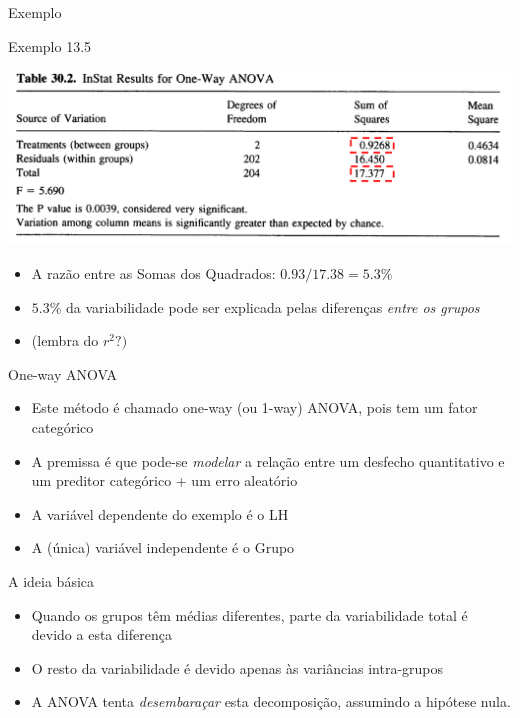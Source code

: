 \documentclass{beamer}
\begin{document}
\begin{frame}{Exemplo}
  \begin{exampleblock}{Exemplo 13.5}
    \begin{center}
      \includegraphics[width=.6\textwidth]{Cap13-30/exemplo13_5-2}
    \end{center}
  \begin{itemize}
  \item A razão entre as Somas dos Quadrados: $0.93/17.38 = 5.3\%$
  \item $5.3\%$ da variabilidade pode ser explicada pelas diferenças {\em entre os grupos}
  \item (lembra do $r^2?)$
  \end{itemize}
  \end{exampleblock}
\end{frame}

\begin{frame}{One-way ANOVA}
  \begin{itemize}
  \item Este método é chamado one-way (ou 1-way) ANOVA, pois tem um fator categórico
  \item A premissa é que pode-se {\em modelar} a relação entre um desfecho quantitativo e um preditor categórico + um erro aleatório
  \item A variável dependente do exemplo é o LH
  \item A (única) variável independente é o Grupo
  \end{itemize}
\end{frame}

\begin{frame}{A ideia básica}
  \begin{itemize}
  \item Quando os grupos têm médias diferentes, parte da variabilidade total é devido a esta diferença
  \item O resto da variabilidade é devido apenas às variâncias intra-grupos
  \item A ANOVA tenta {\em desembaraçar} esta decomposição, assumindo a hipótese nula.
  \end{itemize}
\end{frame}
\end{document}
